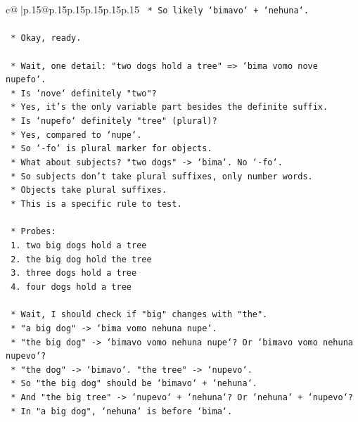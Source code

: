 \documentclass{article}
\begin{document}
{\begin{supertabular}{c@{$\;$}|p{.15\linewidth}@{}p{.15\linewidth}p{.15\linewidth}p{.15\linewidth}p{.15\linewidth}p{.15\linewidth}}
{{{\texttt{    *   So likely `bimavo` + `nehuna`.} \\
\\ 
\texttt{    *   Okay, ready.} \\
\\ 
\texttt{    *   Wait, one detail: "two dogs hold a tree" => `bima vomo nove nupefo`.} \\
\texttt{    *   Is `nove` definitely "two"?} \\
\texttt{    *   Yes, it's the only variable part besides the definite suffix.} \\
\texttt{    *   Is `nupefo` definitely "tree" (plural)?} \\
\texttt{    *   Yes, compared to `nupe`.} \\
\texttt{    *   So `{-}fo` is plural marker for objects.} \\
\texttt{    *   What about subjects? "two dogs" {-}> `bima`. No `{-}fo`.} \\
\texttt{    *   So subjects don't take plural suffixes, only number words.} \\
\texttt{    *   Objects take plural suffixes.} \\
\texttt{    *   This is a specific rule to test.} \\
\\ 
\texttt{    *   Probes:} \\
\texttt{        1.  two big dogs hold a tree} \\
\texttt{        2.  the big dog hold the tree} \\
\texttt{        3.  three dogs hold a tree} \\
\texttt{        4.  four dogs hold a tree} \\
\\ 
\texttt{    *   Wait, I should check if "big" changes with "the".} \\
\texttt{    *   "a big dog" {-}> `bima vomo nehuna nupe`.} \\
\texttt{    *   "the big dog" {-}> `bimavo vomo nehuna nupe`? Or `bimavo vomo nehuna nupevo`?} \\
\texttt{    *   "the dog" {-}> `bimavo`. "the tree" {-}> `nupevo`.} \\
\texttt{    *   So "the big dog" should be `bimavo` + `nehuna`.} \\
\texttt{    *   And "the big tree" {-}> `nupevo` + `nehuna`? Or `nehuna` + `nupevo`?} \\
\texttt{    *   In "a big dog", `nehuna` is before `bima`.} \\
}}}
\end{supertabular}}
\end{document}
